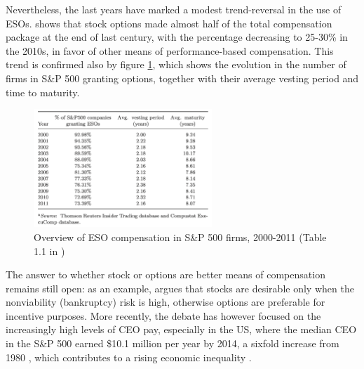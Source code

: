 Nevertheless, the last years have marked a modest trend-reversal in the use of ESOs. \citet{frydman2010ceo} shows that stock options made almost half of the total compensation package at the end of last century, with the percentage decreasing to 25-30\% in the 2010s, in favor of other means of performance-based compensation. This trend is confirmed also by figure \ref{fig:leung_tab_1-1}, which shows the evolution in the number of firms in S\&P 500 granting options, together with their average vesting period and time to maturity. 

\vspace*{15pt}
\begin{figure}[H]
    \centering
    \includegraphics[width=0.6\textwidth]{fig/2/Leung_tab1-1.png}
    \caption{Overview of ESO compensation in S\&P 500 firms, 2000-2011 (Table 1.1 in \citet{leung2021employee})}
    \label{fig:leung_tab_1-1}
\end{figure}
\vspace*{15pt}

The answer to whether stock or options are better means of compensation remains still open: as an example, \citet{kadan2008stocks} argues that stocks are desirable only when the nonviability (bankruptcy) risk is high, otherwise options are preferable for incentive purposes. 
More recently, the debate has however focused on the increasingly high levels of CEO pay, especially in the US, where the median CEO in the S\&P 500 earned \$10.1 million per year by 2014, a sixfold increase from 1980 \citep{edmans2017executive}, which contributes to a rising economic inequality \citep{mishel2012ceo}.




